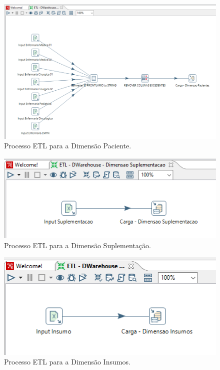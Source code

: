 \begin{figure}[htb]
	\caption{\label{fig_etldimensaopaciente}Processo ETL para a Dimensão Paciente.}
	\begin{center}
	    \includegraphics[scale=0.6]{Imagens/figura - etl dw paciente.png}
	\end{center}
\end{figure}
                    \clearpage
\begin{figure}[htb]
	\caption{\label{fig_etldimensaosuplementacao}Processo ETL para a Dimensão Suplementação.}
	\begin{center}
	    \includegraphics[scale=0.8]{Imagens/figura - etl dw suplementacao.png}
	\end{center}
\end{figure}

\begin{figure}[htb]
	\caption{\label{fig_etldimensaoinsumo}Processo ETL para a Dimensão Insumos.}
	\begin{center}
	    \includegraphics[scale=0.82]{Imagens/figura - etl dw insumos.png}
	\end{center}
\end{figure}

